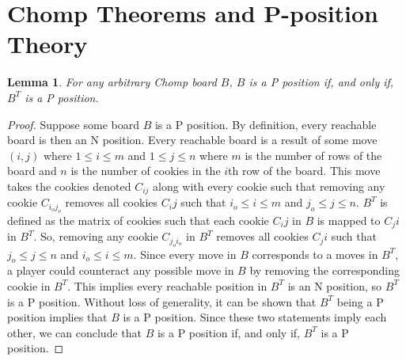 \documentclass{amsart}
\newtheorem{lem}[thm]{Lemma}
\theoremstyle{definition}
\theoremstyle{remark}
\numberwithin{equation}{section}
\begin{document}











\section{Chomp Theorems and P-position Theory}
\label{theorems}



\begin{lem}
	\label{lem:tr}
	For any arbitrary Chomp board $B$, $B$ is a P position if, and only if, $B^T$ is a P position.
\end{lem}


\begin{proof}
	Suppose some board $B$ is a P position.  By definition, every reachable board is then an N position.  Every reachable board is a result of some move $(i,j)$ where $1\leq i \leq m$ and $1\leq j \leq n$ where $m$ is the number of rows of the board and $n$ is the number of cookies in the $i$th row of the board.  This move takes the cookies denoted $C_{ij}$ along with every cookie such that removing any cookie $C_{i_oj_o}$ removes all cookies $C_ij$ such that $i_o \leq i\leq m$ and $j_o\leq j \leq n$.  $B^T$ is defined as the matrix of cookies such that each cookie $C_ij$ in $B$ is mapped to $C_ji$ in $B^T$.  So, removing any cookie $C_{j_oi_o}$ in $B^T$ removes all cookies   $C_ji$ such that $j_o\leq j \leq n$ and $i_o \leq i\leq m$.  Since every move in $B$ corresponds to a moves in $B^T$, a player could counteract any possible move in $B$ by removing the corresponding cookie in $B^T$.  This implies every reachable position in $B^T$ is an N position, so $B^T$ is a P position.  Without loss of generality, it can be shown that $B^T$ being a P position implies that $B$ is a P position.  Since these two statements imply each other, we can conclude that $B$ is a P position if, and only if, $B^T$ is a P position.
\end{proof}
\end{document}
